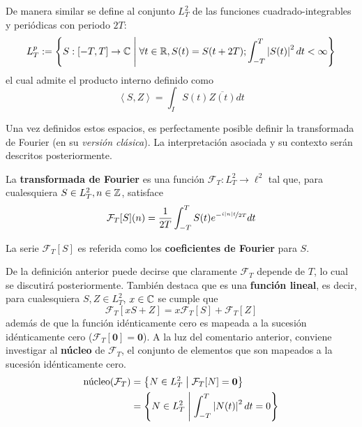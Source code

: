 De manera similar se define al conjunto $L^{2}_T$ de las funciones cuadrado-integrables y periódicas con periodo $2T$:
\begin{equation}
L^{p}_T := \left\{ S: [-T,T]\rightarrow\mathbb{C} \mathrel{}\middle|\mathrel{} \forall t\in \mathbb{R}, S(t) = S(t+2T) ;  \int_{-T}^{T} \left| S(t) \right|^{2} dt < \infty \right\}
\end{equation}
el cual admite el producto interno definido como
\begin{equation}
\left\langle S,Z \right\rangle = \int_I S(t) \overline{Z(t)} dt
\end{equation}

Una vez definidos estos espacios, es perfectamente posible definir la transformada de Fourier (en su \textit{versión clásica}). 
%
La interpretación asociada y su contexto serán descritos posteriormente.

\begin{definicion}
La \textbf{transformada de Fourier} es una función $\mathcal{F}_T : L^{2}_T \rightarrow \ell^{2}$ tal que, para cualesquiera $S\in L^{2}_T, n\in \mathbb{Z}$, satisface
\begin{equation}
\mathcal{F}_T[S](n) = \frac{1}{2 T} \int_{- T }^{ T } S(t) e^{-\nicefrac{ i \left| n \right| t}{2T}} dt
\end{equation}

La serie $\mathcal{F}_T[S]$ es referida como los \textbf{coeficientes de Fourier} para $S$.
\end{definicion}

De la definición anterior puede decirse que claramente $\mathcal{F}_T$ depende de $T$, lo cual se discutirá posteriormente.
%
También destaca que es una \textbf{función lineal}, es decir, para cualesquiera $S, Z \in L^{2}_T$, $x\in \mathbb{C}$ se cumple que
\begin{equation}
\mathcal{F}_T[xS + Z] = x\mathcal{F}_T[S] + \mathcal{F}_T[Z]
\end{equation}
además de que la función idénticamente cero es mapeada a la sucesión idénticamente cero ($\mathcal{F}_T[\boldsymbol{0}]=\boldsymbol{0}$).
%
A la luz del comentario anterior, conviene investigar al \textbf{núcleo} de $\mathcal{F}_T$, el conjunto de elementos que son mapeados a la sucesión idénticamente cero.
%
\begin{align}
\text{núcleo}(\mathcal{F}_T) &= \left\{ N\in L^{2}_T \mathrel{}\middle|\mathrel{} \mathcal{F}_T[N] = \boldsymbol{0}  \right\} \\
&= \left\{ N\in L^{2}_T \mathrel{}\middle|\mathrel{} \int_{- T }^{ T } \left| N(t) \right|^{2} dt = 0 \right\}
\end{align}

